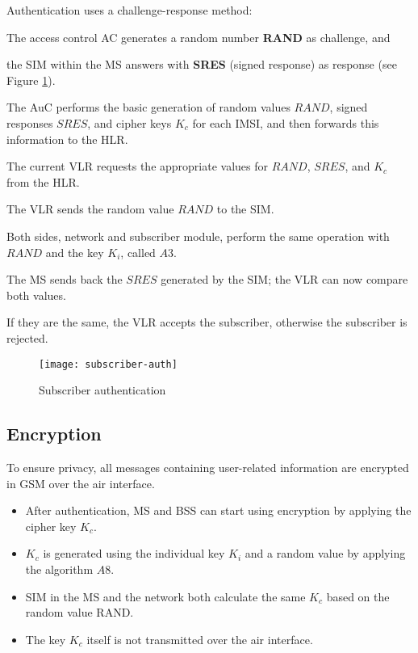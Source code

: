 \noindent Authentication uses a challenge-response method:
\begin{steps}
	\item The access control AC generates a random number \textbf{RAND} as challenge, and 
	\item the SIM within the MS answers with \textbf{SRES} (signed response) as response (see Figure \ref{fig:subscriber-auth}). 
	\item The AuC performs the basic generation of random values $ RAND $, signed responses $ SRES $, and cipher keys $ K_c $ for each IMSI, and then forwards this information to the HLR. 
	\item The current VLR requests the appropriate values for $ RAND $, $ SRES $, and $ K_c $ from the HLR.
	\item The VLR sends the random value $ RAND $ to the SIM. 
	\item Both sides, network and subscriber module, perform the same operation with $ RAND $ and the key $ K_i $, called $ A3 $. 
	\item The MS sends back the $ SRES $ generated by the SIM; the VLR can now compare both values. 
	\item If they are the same, the VLR accepts the subscriber, otherwise the subscriber is rejected.
\end{steps}




\begin{figure}[ht!]
	\vspace*{0.2cm}
	\centering
	\texttt{[image: subscriber-auth]}
	\caption{Subscriber authentication}\label{fig:subscriber-auth}
\end{figure}


\subsection{Encryption}\label{sec:encryption}
To ensure privacy, all messages containing user-related information are encrypted in GSM over the air interface. 

\begin{itemize}
	\item After authentication, MS and BSS can start using encryption by applying the cipher key $ K_c $. 
	\item $ K_c $ is generated using the individual key $ K_i $ and a random value by applying the algorithm $ A8 $. 
	\item SIM in the MS and the network both calculate the same $ K_c $ based on the random value RAND. 
	\item The key $ K_c $ itself is not transmitted over the air interface.
\end{itemize}

